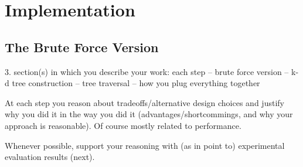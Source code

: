\section{Implementation}
\label{sec:brute}
\subsection{The Brute Force Version}

3. section(s) in which you describe your work: each step
    -- brute force version
    -- k-d tree construction
    -- tree traversal
    -- how you plug everything together

At each step you reason about tradeoffs/alternative design choices and
justify why you did it in the way you did it (advantages/shortcommings,
and why your approach is reasonable). Of course mostly related to performance.

Whenever possible, support your reasoning with (as in point to) experimental
evaluation results (next).

